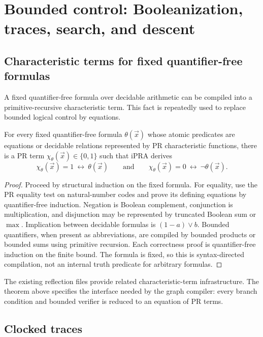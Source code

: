 \section{Bounded control: Booleanization, traces, search, and descent}

\subsection{Characteristic terms for fixed quantifier-free formulas}

A fixed quantifier-free formula over decidable arithmetic can be compiled into
a primitive-recursive characteristic term.  This fact is repeatedly used to
replace bounded logical control by equations.

\begin{theorem}\label{thm:booleanization}
For every fixed quantifier-free formula \(\theta(\vec x)\) whose atomic
predicates are equations or decidable relations represented by PR
characteristic functions, there is a PR term \(\chi_\theta(\vec x)\in\{0,1\}\)
such that iPRA derives
\[
   \chi_\theta(\vec x)=1\ \leftrightarrow\ \theta(\vec x)
   \qquad\text{and}\qquad
   \chi_\theta(\vec x)=0\ \leftrightarrow\ \neg\theta(\vec x).
\]
\end{theorem}

\begin{proof}
Proceed by structural induction on the fixed formula.  For equality, use the
PR equality test on natural-number codes and prove its defining equations by
quantifier-free induction.  Negation is Boolean complement, conjunction is
multiplication, and disjunction may be represented by truncated Boolean sum or
\(\max\).  Implication between decidable formulas is
\((1-a)\vee b\).  Bounded quantifiers, when present as abbreviations, are
compiled by bounded products or bounded sums using primitive recursion.  Each
correctness proof is quantifier-free induction on the finite bound.  The
formula is fixed, so this is syntax-directed compilation, not an internal
truth predicate for arbitrary formulas.
\end{proof}

The existing  reflection files provide related
characteristic-term infrastructure.  The theorem above specifies the interface
needed by the graph compiler: every branch condition and bounded verifier is
reduced to an equation of PR terms.

\subsection{Clocked traces}

